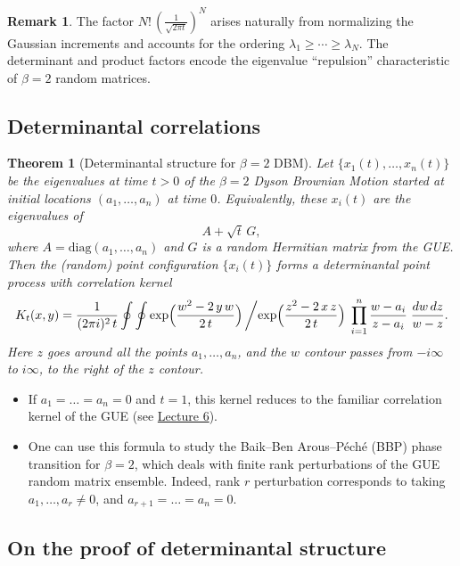 \documentclass[letterpaper,11pt,oneside,reqno]{article}
\numberwithin{equation}{section}
\newtheorem{theorem}[proposition]{Theorem}
\theoremstyle{definition}
\newtheorem{remark}[proposition]{Remark}
\begin{document}
\begin{remark}
The factor \(N!\,(\tfrac{1}{\sqrt{2\pi t}})^N\) arises naturally from normalizing the Gaussian increments and accounts for the ordering \(\lambda_1\ge\cdots\ge \lambda_N\).  The determinant and product factors encode the eigenvalue ``repulsion'' characteristic of \(\beta=2\) random matrices.
\end{remark}


\subsection{Determinantal correlations}

\begin{theorem}[Determinantal structure for $\beta=2$ DBM]
\label{thm:dbm-det-kernel}
Let $\{x_1(t),\dots,x_n(t)\}$ be the eigenvalues at time $t>0$ of the $\beta=2$ Dyson Brownian Motion started at initial locations $(a_1,\dots,a_n)$ at time $0$.  Equivalently, these $x_i(t)$ are the eigenvalues of
\[
A + \sqrt{t}\,G,
\]
where $A=\mathrm{diag}(a_1,\dots,a_n)$ and $G$ is a random Hermitian matrix from the GUE.  Then the (random) point configuration $\{x_i(t)\}$ forms a determinantal point process with correlation kernel
\[
K_t(x,y)
=
\frac{1}{(2\pi i)^2\,t}
\oint \oint
\exp\Bigl(\frac{w^2 - 2\,y\,w}{2\,t}\Bigr)\,
\biggl/
\exp\Bigl(\frac{z^2 - 2\,x\,z}{2\,t}\Bigr)
\;\prod_{i=1}^n \frac{w - a_i}{z - a_i}
\;\frac{dw\,dz}{w - z}.
\]
Here $z$ goes around all the points $a_1,\ldots,a_n $,
and the $w$ contour
passes from $-i\infty$ to $i\infty$, to the right of the $z$ contour.
\end{theorem}

\begin{itemize}
	\item If $a_1=\dots=a_n=0$ and $t=1$, this kernel reduces to the familiar correlation kernel of the GUE (see \href{https://lpetrov.cc/rmt25/rmt25-notes/rmt2025-l06.pdf}{Lecture 6}).
\item
	One can use this formula to study the Baik--Ben
	Arous--P\'ech\'e (BBP)
	\cite{BBP2005phase}
	phase transition for $\beta=2$,
	which deals with finite rank perturbations of the GUE random matrix ensemble.
	Indeed, rank $r$ perturbation corresponds to taking $a_1,\ldots,a_r\ne0 $,
	and $a_{r+1}=\dots=a_n=0$.
\end{itemize}

\subsection{On the proof of determinantal structure}
\end{document}
